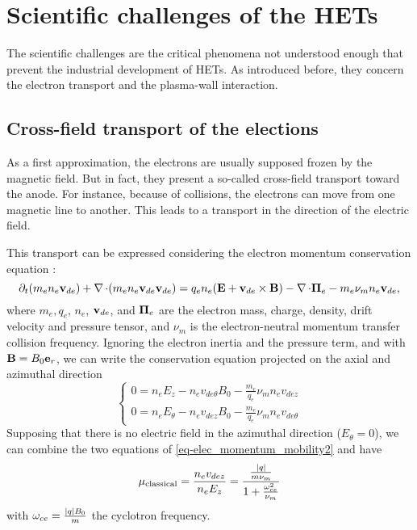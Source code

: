 
\section*{Scientific challenges of the HETs}

The scientific challenges are the critical phenomena not understood enough that prevent the industrial development of \ac{HET}s.
As introduced before, they concern the electron transport and the plasma-wall interaction.

\subsection*{Cross-field transport of the elections}

  \label{sec-mob}
  As a first approximation, the electrons are usually supposed frozen by the magnetic field.
  But in fact, they present a so-called cross-field transport toward the anode.
  For instance, because of collisions, the electrons can move from one magnetic line to another.
  This leads to a transport in the direction of the electric field.
  
  This transport can be expressed considering the electron momentum conservation equation \citep{lafleur2016a}\string:
  \begin{equation} \label{eq-elec_momentum_mobility}
    \partial_t(m_e n_e {\mathbf v}_{de}) + \operatorname{{\mathbf \nabla}} \cdot (m_e n_e  {\mathbf v}_{de} {\mathbf v}_{de}) = q_e n_e ( {\mathbf E} + {\mathbf v}_{de} \times {\mathbf B}) - \operatorname{{\mathbf \nabla}} \cdot {\mathbf \Pi}_e - m_e \nu_m n_e {\mathbf v}_{de},
  \end{equation}
  where $m_e, q_e$, $n_e$, ${\mathbf v}_{de}$, and ${\mathbf \Pi}_e $ are the electron mass, charge, density, drift velocity and pressure tensor, and $\nu_m$ is the electron-neutral momentum transfer collision frequency.
  Ignoring the electron inertia and the pressure term, and with ${\mathbf B} = B_0 {\mathbf e}_r$, we can write the conservation equation projected on the axial and azimuthal direction
  \begin{equation} \label{eq-elec_momentum_mobility2}
  \begin{cases}
    0 =  n_e E_z - n_e v_{de{\theta}} B_0 - \frac{m_e}{q_e} \nu_m n_e v_{dez}\\
    0 =  n_e E_{\theta} -  n_e v_{dez} B_0 - \frac{m_e}{q_e} \nu_m n_e v_{de{\theta}}
  \end{cases}
  \end{equation}
  Supposing that there is no electric field in the azimuthal direction ($E_{\theta}=0$),  we can combine the two equations of \cref{eq-elec_momentum_mobility2} and have \citep{chen2006,meezan2001}
  \begin{equation} \label{eq-mobility}
    \mu_{\mathrm{classical}} = \frac{n_e v_{dez}}{n_e E_z} = \frac{ \frac{\lvert q\rvert}{m \nu_m}}{1 + \frac{\omega_{ce}^2}{\nu_m}}
  \end{equation}
  with $\omega_{ce}= \frac{\lvert q\rvert B_0}{m}$ the cyclotron frequency.
  
